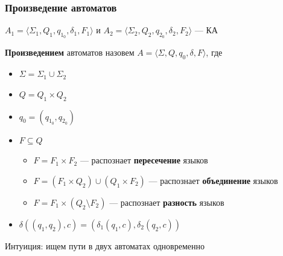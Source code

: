 \documentclass{beamer}
\begin{document}
\begin{frame}[fragile]
\begin{center}
{
    }
  \end{center}

\end{frame}

\begin{frame}[fragile]
  \transwipe[direction=90]
  \frametitle{Произведение автоматов}
   $A_1 = \langle \Sigma_1, Q_1, q_{1_0}, \delta_1, F_1 \rangle$ и $A_2 = \langle \Sigma_2, Q_2, q_{2_0}, \delta_2, F_2 \rangle$ --- КА

   \vfill

  \textbf{Произведением} автоматов назовем $A = \langle \Sigma, Q, q_0, \delta, F \rangle$, где

  \vfill

  \begin{itemize}
    \item $\Sigma = \Sigma_1 \cup \Sigma_2$
    \item $Q = Q_1 \times Q_2$
    \item $q_0 = (q_{1_0}, q_{2_0})$
    \item $F \subseteq Q$
    \begin{itemize}
      \item $F = F_1 \times F_2$ --- распознает \textbf{пересечение} языков
      \item $F = (F_1 \times Q_2) \cup (Q_1 \times F_2)$ --- распознает \textbf{объединение} языков
      \item $F = F_1 \times (Q_2 \setminus F_2)$ --- распознает \textbf{разность} языков
    \end{itemize}
    \item $\delta((q_1, q_2), c) = (\delta_1(q_1, c), \delta_2(q_2, c))$
  \end{itemize}

  \vfill

  Интуиция: ищем пути в двух автоматах одновременно
\end{frame}
\end{document}

